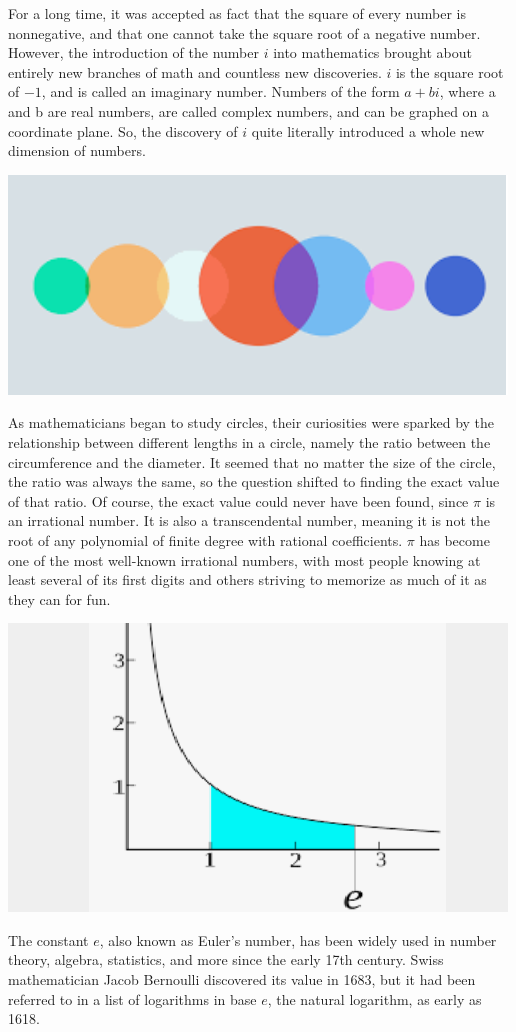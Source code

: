 \documentclass{article}
\begin{document}
For a long time, it was accepted as fact that the square of every number is nonnegative, and that one cannot take the square root of a negative number. However, the introduction of the number $i$ into mathematics brought about entirely new branches of math and countless new discoveries. $i$ is the square root of $-1$, and is called an imaginary number. Numbers of the form $a + bi$, where a and b are real numbers, are called complex numbers, and can be graphed on a coordinate plane. So, the discovery of $i$ quite literally introduced a whole new dimension of numbers.
\begin{center}
    \includegraphics[scale=0.8]{images/specialnum2.png}
\end{center}
As mathematicians began to study circles, their curiosities were sparked by the relationship between different lengths in a circle, namely the ratio between the circumference and the diameter. It seemed that no matter the size of the circle, the ratio was always the same, so the question shifted to finding the exact value of that ratio. Of course, the exact value could never have been found, since $\pi$ is an irrational number. It is also a transcendental number, meaning it is not the root of any polynomial of finite degree with rational coefficients. $\pi$ has become one of the most well-known irrational numbers, with most people knowing at least several of its first digits and others striving to memorize as much of it as they can for fun.
\begin{center}
    \includegraphics[scale=0.8]{images/specialnum3.png}
\end{center}
The constant $e$, also known as Euler’s number, has been widely used in number theory, algebra, statistics, and more since the early 17th century. Swiss mathematician Jacob Bernoulli discovered its value in 1683, but it had been referred to in a list of logarithms in base $e$, the natural logarithm, as early as 1618.
\end{document}
